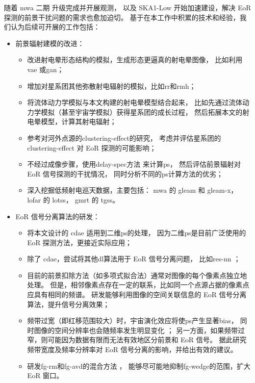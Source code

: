 \begin{summary}
随着 \ac{mwa} 二期 \cite{wayth2018} 升级完成并开展观测，
以及 SKA1-Low 开始加速建设，解决 EoR 探测的前景干扰问题的需求也愈加迫切。
基于在本工作中积累的技术和经验，我们认为后续可开展的工作包括：
\begin{itemize}
\item 前景辐射建模的改进：
  \begin{itemize}
    \item 改进射电晕形态结构的模拟，生成形态更逼真的射电晕图像，
      比如利用\ac{vae}\cite{kingma2013} 或\ac{gan}\cite{goodfellow2014}；
    \item 增加对星系团其他弥散射电辐射的模拟，比如\ac{rr}和\ac{rmh}；
    \item 将流体动力学模拟与本文构建的射电晕模型结合起来，
      比如先通过流体动力学模拟（甚至宇宙学模拟）获得星系团的成长过程，
      然后拓展本文的射电晕模型，计算其射电辐射；
    \item 参考对河外点源的\ac{clustering-effect}的研究，
      考虑并评估星系团的\ac{clustering-effect}\cite{delPopolo2005,fedeli2009}
      对 EoR 探测的可能影响；
    \item 不经过成像步骤，使用\ac{delay-spec}方法\cite{parsons2012}
      来计算\ac{ps}\cite{morales2019}，
      然后评估前景辐射对 EoR 信号探测的干扰情况，
      同时分析不同的\ac{ps}计算方法的优劣；
    \item 深入挖掘低频射电巡天数据，主要包括：
      \ac{mwa} 的 \ac{gleam}\cite{wayth2015,hurleyWalker2017}
      和 \ac{gleam-x}\cite{hurleyWalker2017prop}，
      \ac{lofar} 的 \ac{lotss}\cite{shimwell2017,shimwell2019}，
      \ac{gmrt} 的 \ac{tgss}\cite{intema2017}。
  \end{itemize}

\item EoR 信号分离算法的研发：
  \begin{itemize}
    \item 将本文设计的 \ac{cdae} 适用到二维\ac{ps}的处理，
      因为二维\ac{ps}是目前广泛使用的 EoR 探测方法，更接近实际应用；
    \item 除了 \ac{cdae}，尝试将其他\ac{dl}算法用于 EoR 信号分离问题，
      比如\ac{res-nn} \cite{he2016}；
    \item 目前的前景扣除方法（如多项式拟合法）通常对图像的每个像素点独立地处理。
      但是，相邻像素点存在一定的联系，比如同一个点源占据的像素点应具有相同的频谱。
      研发能够利用图像的空间关联信息的 EoR 信号分离算法，提升信号分离效果；
    \item 频带过宽（即红移范围较大）时，宇宙演化效应将使\ac{ps}产生显著\ac{bias}，
      同时图像的空间分辨率也会随频率发生明显变化 \cite{bowman2009}；
      另一方面，如果频带过窄，则可能因为数据有限而无法有效地区分前景和 EoR 信号。
      据此研究频带宽度及频率分辨率对 EoR 信号分离的影响，并给出有效的建议。
    \item 研发\ac{fg-rm}和\ac{fg-avd}的混合方法 \cite{kerrigan2018}，
      能够尽可能地抑制\ac{fg-wedge}的范围，扩大 EoR 窗口。
  \end{itemize}
\end{itemize}

\end{summary}

